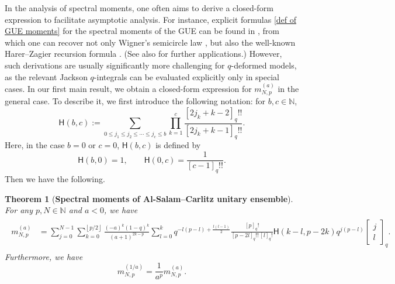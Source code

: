 \documentclass{amsart}
\newcommand{\qbinom}[2]{{\begin{bmatrix}#1\\#2\end{bmatrix}}_q}
\newcommand{\floor}[1]{\left\lfloor#1\right\rfloor}
\theoremstyle{plain}
\newtheorem{thm}{Theorem}[section]
\theoremstyle{remark}
\numberwithin{equation}{section}
\begin{document}
In the analysis of spectral moments, one often aims to derive a closed-form expression to facilitate asymptotic analysis. For instance, explicit formulas \eqref{def of GUE moments} for the spectral moments of the GUE can be found in \cite{HT03,Ke99}, from which one can recover not only Wigner’s semicircle law \cite{Wi55}, but also the well-known Harer--Zagier recursion formula \cite{HZ86}. (See also \cite{MS11,MS12,MS13,CMSV16} for further applications.) However, such derivations are usually significantly more challenging for \( q \)-deformed models, as the relevant Jackson $q$-integrals can be evaluated explicitly only in special cases. In our first main result, we obtain a closed-form expression for \( m_{N,p}^{(a)} \) in the general case.
To describe it, we first introduce the following notation: for $b,c \in \mathbb{N}$, 
    \begin{equation}\label{def of H}
        \mathsf{H}(b,c) :=\sum_{0\leq j_{1}\leq j_{2}\leq\cdots\leq j_{c}\leq b}\prod_{k=1}^{c}\frac{[2j_{k}+k-2]_{q}!!}{[2j_{k}+k-1]_{q}!!}.
    \end{equation} 
Here, in the case $b=0$ or $c=0$, $\mathsf{H}(b,c)$ is defined by
\begin{equation}\label{def of H special cases}
\mathsf{H}(b,0)=1, \qquad \mathsf{H}(0,c)=\frac{1}{[c-1]_{q}!!}.
\end{equation}
Then we have the following. 
 

\begin{thm}[\textbf{Spectral moments of Al-Salam--Carlitz unitary ensemble}] \label{Thm_spectral moments}
For any $p, N \in \mathbb{N}$ and $a<0$, we have 
\begin{align}
\begin{split} \label{moment closed main}
m_{N,p}^{ (a) }  &=  \sum_{j=0}^{N-1}\sum_{k=0}^{\floor{p/2}} \frac{    (-a)^{k} (1-q)^k}{ (a+1)^{2k-p} } \sum_{l=0}^k     q^{-l(p-l)+\frac{l(l-1)}{2}}\frac{[p]_{q}!}{[p-2l]_{q}!! \, [l]_{q}!}\mathsf{H}(k-l,p-2k)q^{j(p-l)}\qbinom{j}{l}.
\end{split}
\end{align}
Furthermore, we have  
\begin{equation}\label{eqn:symmetry of spectral moment}
m_{N,p}^{(1/a)} = \frac{1}{a^p} m_{N,p}^{(a)}. 
\end{equation}
\end{thm}
 
\end{document}
